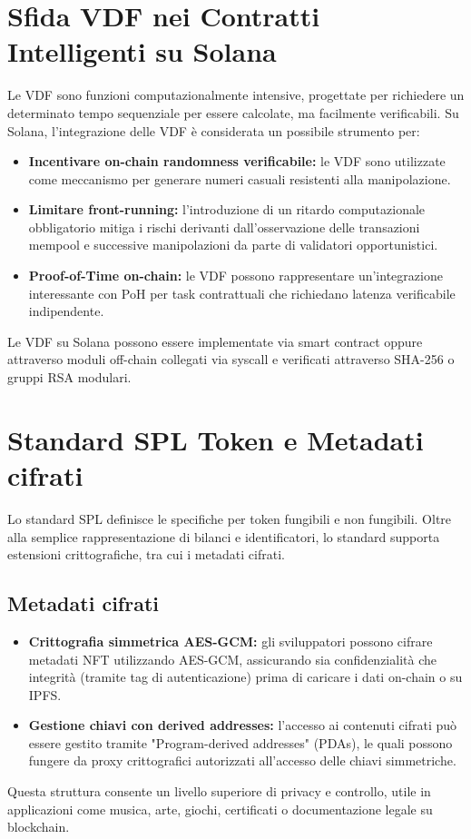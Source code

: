 \documentclass[a4paper,12pt]{report}
\begin{document}
	\section{Sfida VDF nei Contratti Intelligenti su Solana}
	Le VDF sono funzioni computazionalmente intensive, progettate per richiedere un determinato tempo sequenziale per essere calcolate, ma facilmente verificabili. Su Solana, l’integrazione delle VDF è considerata un possibile strumento per:
	\begin{itemize}
		\item \textbf{Incentivare on-chain randomness verificabile:} le VDF sono utilizzate come meccanismo per generare numeri casuali resistenti alla manipolazione.
		\item \textbf{Limitare front-running:} l’introduzione di un ritardo computazionale obbligatorio mitiga i rischi derivanti dall’osservazione delle transazioni mempool e successive manipolazioni da parte di validatori opportunistici.
		\item \textbf{Proof-of-Time on-chain:} le VDF possono rappresentare un’integrazione interessante con PoH per task contrattuali che richiedano latenza verificabile indipendente.
	\end{itemize}
	Le VDF su Solana possono essere implementate via smart contract oppure attraverso moduli off-chain collegati via syscall e verificati attraverso SHA-256 o gruppi RSA modulari.
	
	\section{Standard SPL Token e Metadati cifrati}
	Lo standard SPL definisce le specifiche per token fungibili e non fungibili. Oltre alla semplice rappresentazione di bilanci e identificatori, lo standard supporta estensioni crittografiche, tra cui i metadati cifrati.
	
	\subsection{Metadati cifrati}
	\begin{itemize}
		\item \textbf{Crittografia simmetrica AES-GCM:} gli sviluppatori possono cifrare metadati NFT utilizzando AES-GCM, assicurando sia confidenzialità che integrità (tramite tag di autenticazione) prima di caricare i dati on-chain o su IPFS.
		\item \textbf{Gestione chiavi con derived addresses:} l’accesso ai contenuti cifrati può essere gestito tramite "Program-derived addresses" (PDAs), le quali possono fungere da proxy crittografici autorizzati all’accesso delle chiavi simmetriche.
	\end{itemize}
	Questa struttura consente un livello superiore di privacy e controllo, utile in applicazioni come musica, arte, giochi, certificati o documentazione legale su blockchain.
	
\end{document}
